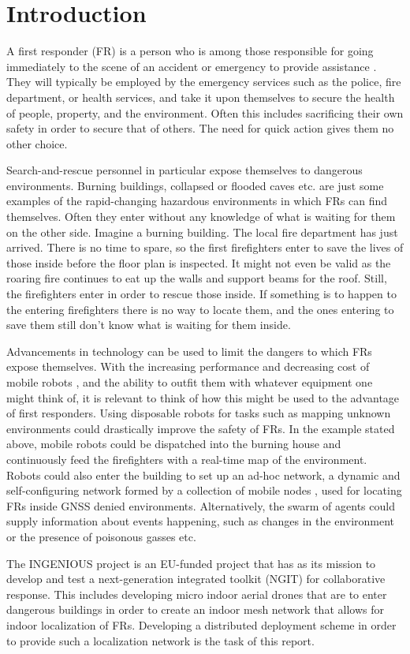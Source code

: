 \section{Introduction}

A first responder (FR) is a person who is among those responsible for going immediately to the scene of an accident or emergency to provide assistance \cite{FR}.
They will typically be employed by the emergency services such as the police, fire department, or health services, and take it upon themselves to secure the health of people, property, and the environment.
Often this includes sacrificing their own safety in order to secure that of others. The need for quick action gives them no other choice.

Search-and-rescue personnel in particular expose themselves to dangerous environments. Burning buildings, collapsed or flooded caves etc. are just some examples of the rapid-changing
hazardous environments in which FRs can find themselves. Often they enter without any knowledge of what is waiting for them on the other side. Imagine a burning building. The local fire department has just arrived. There is no time to 
spare, so the first firefighters enter to save the lives of those inside before the floor plan is inspected. It might not even be valid as the roaring fire continues to eat up the walls and support beams for the roof. Still, the firefighters enter in order to rescue those inside.
If something is to happen to the entering firefighters there is no way to locate them, and the ones entering to save them still don't know what is waiting for them inside.

Advancements in technology can be used to limit the dangers to which FRs expose themselves. With the increasing performance and decreasing cost of mobile robots \cite{MAV_enabling}, and the ability to outfit them with whatever equipment one might think of, it is relevant to think of how 
this might be used to the advantage of first responders. Using disposable robots for tasks such as mapping unknown environments could drastically improve the safety of FRs. In the example stated above, mobile robots could be dispatched into the burning house
and continuously feed the firefighters with a real-time map of the environment. Robots could also enter the building to set up an ad-hoc network, a dynamic and self-configuring network formed by a collection of mobile nodes \cite{GAVHALE2016477}, used for locating FRs inside GNSS denied environments.
Alternatively, the swarm of agents could supply information about events happening, such as changes in the environment or the presence of poisonous gasses etc.

The INGENIOUS project is an EU-funded project that has as its mission to develop and test a next-generation integrated toolkit (NGIT) for collaborative response. This includes 
developing micro indoor aerial drones that are to enter dangerous buildings in order to create an indoor mesh network that allows for indoor localization of FRs.
Developing a distributed deployment scheme in order to provide such a localization network is the task of this report.